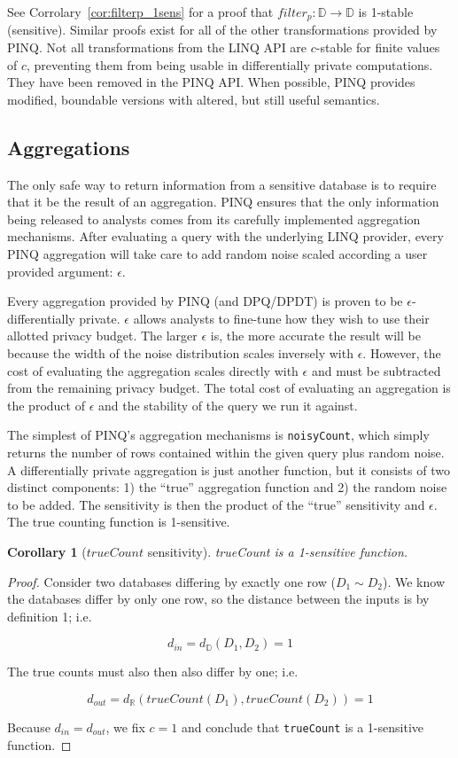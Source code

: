 \documentclass[12pt]{report}
\newtheorem{cor}[defn]{Corollary}
\begin{document}
See Corrolary~\ref{cor:filterp_1sens} for a proof that $filter_p : \mathbb D \rightarrow \mathbb D$ is 1-stable (sensitive).
Similar proofs exist for all of the other transformations provided by PINQ\cite{conf/sigmod/McSherry09}.
Not all transformations from the LINQ API are $c$-stable for finite values of $c$, preventing them from being usable in differentially private computations.
They have been removed in the PINQ API.
When possible, PINQ provides modified, boundable versions with altered, but still useful semantics.

\subsection{Aggregations}

The only safe way to return information from a sensitive database is to require that it be the result of an aggregation.
PINQ ensures that the only information being released to analysts comes from its carefully implemented aggregation mechanisms.
After evaluating a query with the underlying LINQ provider, every PINQ aggregation will take care to add random noise scaled according a user provided argument: $\epsilon$.

Every aggregation provided by PINQ (and DPQ/DPDT) is proven to be $\epsilon$-differentially private.
$\epsilon$ allows analysts to fine-tune how they wish to use their allotted privacy budget.
The larger $\epsilon$ is, the more accurate the result will be because the width of the noise distribution scales inversely with $\epsilon$.
However, the cost of evaluating the aggregation scales directly with $\epsilon$ and must be subtracted from the remaining privacy budget.
The total cost of evaluating an aggregation is the product of $\epsilon$ and the stability of the query we run it against.

The simplest of PINQ's aggregation mechanisms is \texttt{noisyCount}, which simply returns the number of rows contained within the given query plus random noise.
A differentially private aggregation is just another function, but it consists of two distinct components: 1) the ``true'' aggregation function and 2) the random noise to be added.
The sensitivity is then the product of the ``true'' sensitivity and $\epsilon$.
The true counting function is 1-sensitive.

\begin{cor}[$trueCount$ sensitivity]
trueCount is a 1-sensitive function.
\end{cor}
\begin{proof}
Consider two databases differing by exactly one row ($D_1 \sim D_2$).
We know the databases differ by only one row, so the distance between the inputs is by definition 1; i.e.

$$d_{in} = d_{\mathbb D}(D_1,D_2)=1$$

The true counts must also then also differ by one; i.e.

$$d_{out} = d_{\mathbb R}(trueCount(D_1),trueCount(D_2))=1$$

Because $d_{in} = d_{out}$, we fix $c=1$ and conclude that \texttt{trueCount} is a 1-sensitive function.
\end{proof}
\end{document}

